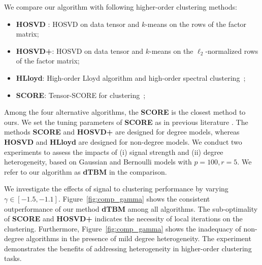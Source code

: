 \documentclass[lettersize,onecolumn,journal]{IEEEtran}
\theoremstyle{definition}
\theoremstyle{definition}
\begin{document}
We compare our algorithm with following higher-order clustering methods:
\begin{itemize}[wide,topsep=-3pt,itemsep=0pt,parsep=1pt]
    \item \textbf{\small HOSVD }: HOSVD on data tensor and $k$-means on the rows of the factor matrix;
    \item \textbf{\small HOSVD+}: HOSVD on data tensor and $k$-means on the $\ell_2$-normalized rows of the factor matrix;
    \item \textbf{\small HLloyd}: High-order Lloyd algorithm and high-order spectral clustering~\citep{han2020exact};
    \item \textbf{\small SCORE}: Tensor-SCORE for clustering~\citep{ke2019community};
\end{itemize}


 Among the four alternative algorithms, the \textbf{\small SCORE} is the closest method to ours.
We set the tuning parameters of \textbf{\small SCORE} as in previous literature \citep{ke2019community}. The methods \textbf{\small SCORE} and \textbf{\small HOSVD+} are designed for degree models, whereas \textbf{\small HOSVD} and \textbf{\small HLloyd} are designed for non-degree models.
We conduct two experiments to assess the impacts of (i) signal strength and (ii) degree heterogeneity, based on Gaussian and Bernoulli models with $ p = 100, r = 5$. We refer to our algorithm as \textbf{\small dTBM} in the comparison. 

We investigate the effects of signal to clustering performance by varying $\gamma \in [-1.5, -1.1]$. Figure~\ref{fig:comp_gamma} shows the consistent outperformance of our method \textbf{\small dTBM} among all algorithms. The sub-optimality of \textbf{\small SCORE} and \textbf{\small HOSVD+} indicates the necessity of local iterations on the clustering. Furthermore,  Figure~\ref{fig:comp_gamma} shows the inadequacy of non-degree algorithms in the presence of mild degree heterogeneity. 
The experiment demonstrates the benefits of addressing heterogeneity in higher-order clustering tasks.   
\end{document}
